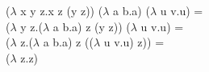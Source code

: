 \documentclass{article}
\begin{document}
\begin{flushleft}

($\lambda$ x y z.x z (y z)) ($\lambda$ a b.a) ($\lambda$ u v.u) = \\ 
($\lambda$ y z.($\lambda$ a b.a) z (y z)) ($\lambda$ u v.u) = \\ 
($\lambda$ z.($\lambda$ a b.a) z (($\lambda$ u v.u) z)) = \\ 
($\lambda$ z.z)

\end{flushleft}
\end{document}
